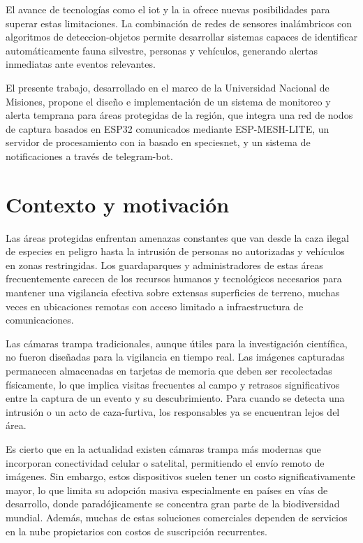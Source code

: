 \documentclass[a4paper, 12pt]{report}
\begin{document}
El avance de tecnologías como el \gls{iot} y la \gls{ia} ofrece nuevas
posibilidades para superar estas limitaciones. La combinación de redes
de sensores inalámbricos con algoritmos de \gls{deteccion-objetos} permite
desarrollar sistemas capaces de identificar automáticamente fauna silvestre,
personas y vehículos, generando alertas inmediatas ante eventos relevantes.

El presente trabajo, desarrollado en el marco de la Universidad Nacional
de Misiones, propone el diseño e implementación de un sistema de
monitoreo y alerta temprana para áreas protegidas de la región, que integra una red
de nodos de captura basados en \gls{ESP32} comunicados mediante \gls{ESP-MESH-LITE},
un servidor de procesamiento con \gls{ia} basado en \gls{speciesnet}, y
un sistema de notificaciones a través de \gls{telegram-bot}.

\section{Contexto y motivación}

Las áreas protegidas enfrentan amenazas constantes que van desde la caza
ilegal de especies en peligro hasta la intrusión de personas no autorizadas
y vehículos en zonas restringidas. Los guardaparques y administradores
de estas áreas frecuentemente carecen de los recursos humanos y tecnológicos
necesarios para mantener una vigilancia efectiva sobre extensas superficies
de terreno, muchas veces en ubicaciones remotas con acceso limitado a
infraestructura de comunicaciones.

Las cámaras trampa tradicionales, aunque útiles para la investigación
científica, no fueron diseñadas para la vigilancia en tiempo real. Las
imágenes capturadas permanecen almacenadas en tarjetas de memoria que
deben ser recolectadas físicamente, lo que implica visitas frecuentes
al campo y retrasos significativos entre la captura de un evento y su
descubrimiento. Para cuando se detecta una intrusión o un acto de \gls{caza-furtiva},
los responsables ya se encuentran lejos del área.

Es cierto que en la actualidad existen cámaras trampa más modernas que
incorporan conectividad celular o satelital, permitiendo el envío remoto
de imágenes. Sin embargo, estos dispositivos suelen tener un costo
significativamente mayor, lo que limita su adopción masiva especialmente
en países en vías de desarrollo, donde paradójicamente se concentra gran
parte de la biodiversidad mundial. Además, muchas de estas soluciones
comerciales dependen de servicios en la nube propietarios con costos
de suscripción recurrentes.
\end{document}
